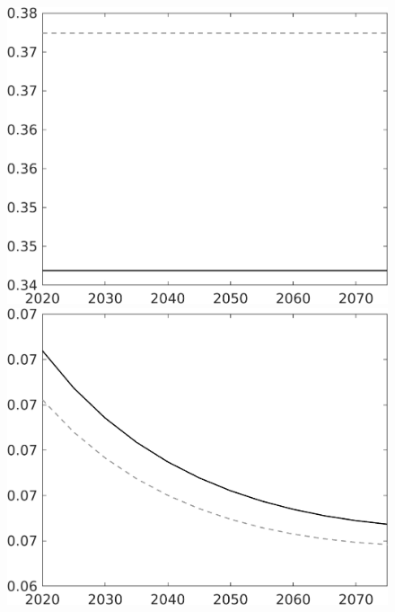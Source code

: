 \begin{figure}[h!!]
\begin{minipage}[]{0.32\textwidth}
	\end{minipage}	
	\begin{minipage}[]{0.32\textwidth}
		\includegraphics[width=1\textwidth]{../../codding_model/own_basedOnFried/optimalPol_010922_revision/figures/all_13Sept22/CompTaul_LFBAU_Reg0_hh_spillover0_nsk1_xgr0_sep1_countec0_GovRev1_etaa0.79_lgd0.png}
	\end{minipage}	
	\begin{minipage}[]{0.32\textwidth}
		\includegraphics[width=1\textwidth]{../../codding_model/own_basedOnFried/optimalPol_010922_revision/figures/all_13Sept22/CompTaul_LFBAU_Reg0_sff_spillover0_nsk1_xgr0_sep1_countec0_GovRev1_etaa0.79_lgd0.png}

\end{minipage}
\end{figure}
